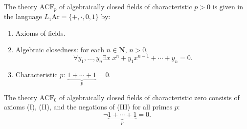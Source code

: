 The theory $\mathrm{ACF}_p$ of algebraically closed fields of characteristic $p > 0$ is given in the language $L_1\mathrm{Ar} = \{+, \cdot, 0, 1\}$ by:
\begin{enumerate}
\item[(I)] Axioms of fields.
\item[(II)] Algebraic closedness: for each $n \in \mathbf{N}$, $n > 0$,
$$\forall y_1, \ldots, y_n \exists x \; x^n + y_1 x^{n-1} + \cdots + y_n = 0.$$
\item[(III)] Characteristic $p$: $\underbrace{1 + \cdots + 1}_{p} = 0.$
\end{enumerate}
The theory $\mathrm{ACF}_0$ of algebraically closed fields of characteristic zero consists of axioms (I), (II), and the negations of (III) for all primes $p$:
$$\neg \underbrace{1 + \cdots + 1}_{p} = 0.$$
